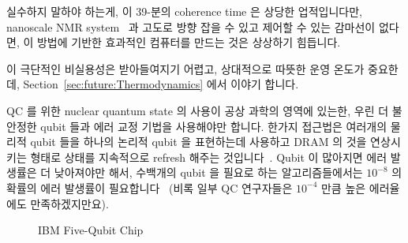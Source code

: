실수하지 말하야 하는게, 이 39-분의 coherence time 은 상당한 업적입니다만,
nanoscale NMR system~\cite{HJMamin2013QC-nanoscale-NMR} 과 고도로 방향 잡을 수
있고 제어할 수 있는 감마선이 없다면, 이 방법에 기반한 효과적인 컴퓨터를 만드는
것은 상상하기 힘듭니다.

이 극단적인 비실용성은 받아들여지기 어렵고, 상대적으로 따뜻한 운영 온도가
중요한데,
Section~\ref{sec:future:Thermodynamics} 에서 이야기 합니다.

QC 를 위한 nuclear quantum state 의 사용이 공상 과학의 영역에 있는한, 우린 더
불안정한 qubit 들과 에러 교정 기법을 사용해야만 합니다.
한가지 접근법은 여러개의 물리적 qubit 들을 하나의 논리적 qubit 을 표현하는데
사용하고 DRAM 의 것을 연상시키는 형태로 상태를 지속적으로 refresh 해주는
것입니다~\cite{DanielThomasSankPhD}.
Qubit 이 많아지면 에러 발생률은 더 낮아져야만 해서, 수백개의 qubit 을 필요로
하는 알고리즘들에서는 $10^{-8}$ 의 확률의 에러 발생률이
필요합니다~\cite{DanielThomasSankPhD} (비록 일부 QC 연구자들은 $10^{-4}$ 만큼
높은 에러율에도 만족하겠지만요).

\begin{figure}[tb]
\centering
{}
\caption{IBM Five-Qubit Chip}
\label{fig:future:IBM Five-Qubit Chip}
\end{figure}

